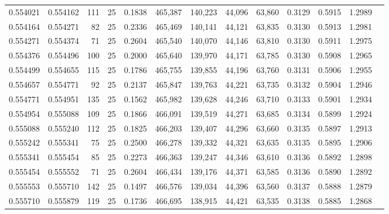\begin{tabular}{rrrrrrrrrrrrr}
0.554021 & 0.554162 &   111 &  25 &                                     0.1838 & 465,387 & 140,223 &  44,096 &  63,860 & 0.3129 & 0.5915 & 1.2989 \\
0.554164 & 0.554271 &    82 &  25 &                                     0.2336 & 465,469 & 140,141 &  44,121 &  63,835 & 0.3130 & 0.5913 & 1.2981 \\
0.554271 & 0.554374 &    71 &  25 &                                     0.2604 & 465,540 & 140,070 &  44,146 &  63,810 & 0.3130 & 0.5911 & 1.2975 \\
0.554376 & 0.554496 &   100 &  25 &                                     0.2000 & 465,640 & 139,970 &  44,171 &  63,785 & 0.3130 & 0.5908 & 1.2965 \\
0.554499 & 0.554655 &   115 &  25 &                                     0.1786 & 465,755 & 139,855 &  44,196 &  63,760 & 0.3131 & 0.5906 & 1.2955 \\
0.554657 & 0.554771 &    92 &  25 &                                     0.2137 & 465,847 & 139,763 &  44,221 &  63,735 & 0.3132 & 0.5904 & 1.2946 \\
0.554771 & 0.554951 &   135 &  25 &                                     0.1562 & 465,982 & 139,628 &  44,246 &  63,710 & 0.3133 & 0.5901 & 1.2934 \\
0.554954 & 0.555088 &   109 &  25 &                                     0.1866 & 466,091 & 139,519 &  44,271 &  63,685 & 0.3134 & 0.5899 & 1.2924 \\
0.555088 & 0.555240 &   112 &  25 &                                     0.1825 & 466,203 & 139,407 &  44,296 &  63,660 & 0.3135 & 0.5897 & 1.2913 \\
0.555242 & 0.555341 &    75 &  25 &                                     0.2500 & 466,278 & 139,332 &  44,321 &  63,635 & 0.3135 & 0.5895 & 1.2906 \\
0.555341 & 0.555454 &    85 &  25 &                                     0.2273 & 466,363 & 139,247 &  44,346 &  63,610 & 0.3136 & 0.5892 & 1.2898 \\
0.555454 & 0.555552 &    71 &  25 &                                     0.2604 & 466,434 & 139,176 &  44,371 &  63,585 & 0.3136 & 0.5890 & 1.2892 \\
0.555553 & 0.555710 &   142 &  25 &                                     0.1497 & 466,576 & 139,034 &  44,396 &  63,560 & 0.3137 & 0.5888 & 1.2879 \\
0.555710 & 0.555879 &   119 &  25 &                                     0.1736 & 466,695 & 138,915 &  44,421 &  63,535 & 0.3138 & 0.5885 & 1.2868 \\

\end{tabular}
